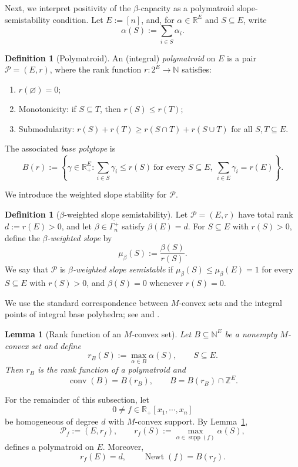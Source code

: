 \documentclass[oneside,english,letterpaper]{amsart}
\numberwithin{equation}{section}
\theoremstyle{plain}
\newtheorem{lem}[thm]{Lemma}
\theoremstyle{definition}
\newtheorem{defn}[thm]{Definition}
\theoremstyle{remark}
\def\R{\mathbb R}
\def\N{\mathbb N}
\def\Newt{\operatorname{Newt}}
\begin{document}
Next, we interpret positivity of the \(\beta\)-capacity as a polymatroid
slope-semistability condition. Let \(E:=[n]\), and, for
\(\alpha\in\mathbb R^E\) and \(S\subseteq E\), write
\[
\alpha(S):=\sum_{i\in S}\alpha_i.
\]
\begin{defn}[Polymatroid]
\label{def:integral-polymatroid}
An (integral) \emph{polymatroid} on \(E\) is a pair
\(\mathcal P=(E,r)\), where the rank function
\(r\colon 2^E\to\mathbb N\) satisfies:
\begin{enumerate}
    \item \(r(\varnothing)=0\);
    \item {Monotonicity:} if \(S\subseteq T\), then \(r(S)\leq r(T)\);
    \item {Submodularity:}
    $
    r(S)+r(T)\geq r(S\cap T)+r(S\cup T)$
    for all \(S,T\subseteq E\).
\end{enumerate}
The associated \emph{base polytope} is
\[
B(r)
:=
\left\{
\gamma\in\R_+^E:
\sum_{i\in S} \gamma_i\leq r(S)\ \text{for every }S\subseteq E,\
\sum_{i\in E} \gamma_i=r(E)
\right\}.
\]
\end{defn}

We introduce the weighted slope stability for  $\mathcal P$.
\begin{defn}[\(\beta\)-weighted slope semistability]
\label{def:beta-polymatroid-semistability}
Let $\mathcal P=(E,r)$ have total rank $d:=r(E)>0$, and let \(\beta\in\overline{\Gamma_n^+}\) satisfy \(\beta(E)=d\).
For \(S\subseteq E\) with \(r(S)>0\), define the
\emph{\(\beta\)-weighted slope} by
\[
\mu_\beta(S):=\frac{\beta(S)}{r(S)}.
\]
We say that \(\mathcal P\) is
\emph{\(\beta\)-weighted slope semistable} if
\(\mu_\beta(S)\leq\mu_\beta(E)=1\) for every \(S\subseteq E\) with
\(r(S)>0\), and \(\beta(S)=0\) whenever \(r(S)=0\).
\end{defn}

We use the standard correspondence between \(M\)-convex sets and
the integral points of integral base polyhedra; see
\cite[Chapter~4]{Murota03} and
\cite[Chapter~3]{MR2171629}.
\begin{lem}[Rank function of an \(M\)-convex set]
\label{lem:M-convex-support-rank}
Let \(B\subseteq\N^E\) be a nonempty \(M\)-convex set and define
\[
r_B(S):=\max_{\alpha\in B}\alpha(S),
\qquad S\subseteq E.
\]
Then \(r_B\) is the rank function of a polymatroid and
\[
\operatorname{conv}(B)=B(r_B),
\qquad
B=B(r_B)\cap\mathbb Z^E.
\]
\end{lem}

For the remainder of this subsection, let
\begin{equation}
0\neq f\in\R_+[x_1,\cdots,x_n]
\label{eq:M-convex-polynomial}
\end{equation}
be homogeneous of degree \(d\) with \(M\)-convex support.
By Lemma~\ref{lem:M-convex-support-rank},
\[
\mathcal P_f:=(E,r_f), \qquad r_f(S)
:=
\max_{\alpha\in\operatorname{supp}(f)}\alpha(S),
\] defines a polymatroid on $E$.
Moreover,
\begin{equation}
r_f(E)=d,
\qquad
\Newt(f)=B(r_f).
\label{eq:support-polymatroid-base}
\end{equation}
\end{document}
